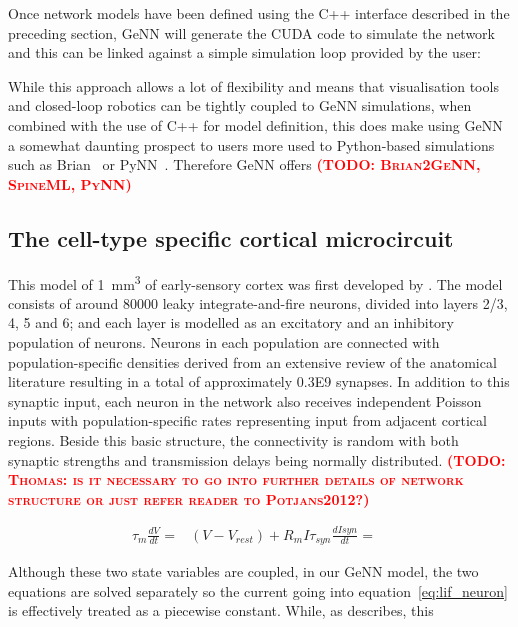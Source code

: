 \documentclass[utf8]{frontiersSCNS} %
\newcommand{\todo}[1]{\textbf{\textsc{\textcolor{red}{(TODO: #1)}}}}
\begin{document}
Once network models have been defined using the C++ interface described in the preceding section, GeNN will generate the CUDA code to simulate the network and this can be linked against a simple simulation loop provided by the user:



While this approach allows a lot of flexibility and means that visualisation tools and closed-loop robotics can be tightly coupled to GeNN simulations, when combined with the use of C++ for model definition, this does make using GeNN a somewhat daunting prospect to users more used to Python-based simulations such as Brian~\citep{Stimberg2014} or PyNN~\citep{Davison2008a}.
Therefore GeNN offers
\todo{Brian2GeNN, SpineML, PyNN}

\subsection{The cell-type specific cortical microcircuit}
\label{sec:method/microcircuit}
This model of \SI{1}{\milli\metre\cubed} of early-sensory cortex was first developed by \citet{Potjans2012}.
The model consists of around \num{80000} leaky integrate-and-fire neurons, divided into layers 2/3, 4, 5 and 6; and each layer is modelled as an excitatory and an inhibitory population of neurons.
Neurons in each population are connected with population-specific densities derived from an extensive review of the anatomical literature resulting in a total of approximately \num{0.3E9} synapses.
In addition to this synaptic input, each neuron in the network also receives independent Poisson inputs with population-specific rates representing input from adjacent cortical regions.
Beside this basic structure, the connectivity is random with both synaptic strengths and transmission delays being normally distributed.
\todo{Thomas: is it necessary to go into further details of network structure or just refer reader to Potjans2012?}

\begin{align}
    \tau_{m} \frac{dV}{dt} = & (V - V_{rest}) + R_{m}I
    \tau_{syn} \frac{dI{syn}}{dt} = & 
\end{align}

Although these two state variables are coupled, in our GeNN model, the two equations are solved separately so the current going into equation~\ref{eq:lif_neuron} is effectively treated as a piecewise constant.
While, as \citet{Rotter1999} describes, this 
\end{document}
